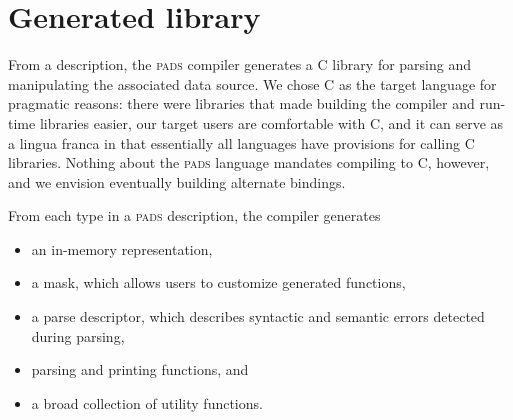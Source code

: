 \documentclass{sigplanconf}
\newcommand{\pads}{\textsc{pads}}
\newcommand{\C}{\textsc{C}}
\begin{document}
\section{Generated library}
From a description, the \pads{} compiler generates a \C{} library
for parsing and manipulating the associated data source.  We chose \C{}
as the target language for pragmatic reasons: there were 
libraries that made building the compiler and run-time libraries easier,
our target users are comfortable with \C{}, and it can serve 
as a lingua franca in that essentially all languages have provisions for 
calling \C{} libraries.  Nothing about the \pads{} language mandates compiling
to \C{}, however, and we envision eventually building alternate bindings.

From each type in a \pads{} description, the compiler generates 
\begin{itemize}
\setlength{\itemsep}{0ex plus0.2ex}
\item an in-memory representation, 
\item a mask, which allows users to customize generated functions,
\item a parse descriptor, which describes syntactic and
semantic errors detected during parsing, 
\item parsing and printing functions, and 
\item a broad collection of utility functions.
\end{itemize}
%
\setcounter{totalnumber}{1}
\setcounter{dbltopnumber}{1}
\renewcommand{\topfraction}{0.85}
\renewcommand{\textfraction}{0.1}
\renewcommand{\floatpagefraction}{0.75}
\end{document}

